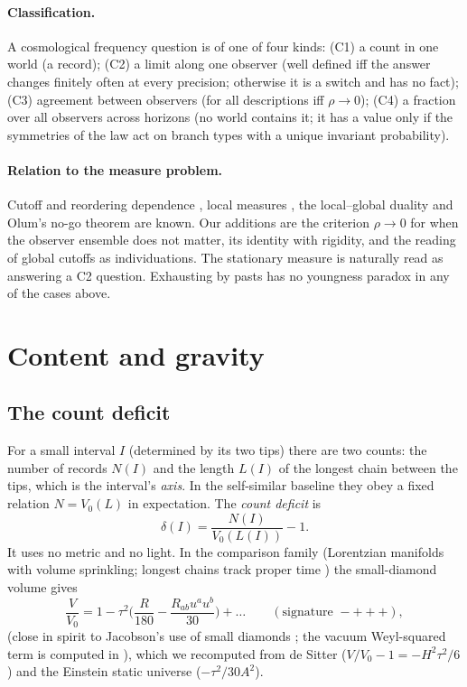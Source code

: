 \documentclass[11pt]{article}
\theoremstyle{definition}
\theoremstyle{remark}
\begin{document}
\paragraph{Classification.} A cosmological frequency question is of one of four kinds: (C1) a count in one world (a record); (C2) a limit along one observer (well defined iff the answer changes finitely often at every precision; otherwise it is a switch and has no fact); (C3) agreement between observers (for all descriptions iff $\rho\to0$); (C4) a fraction over all observers across horizons (no world contains it; it has a value only if the symmetries of the law act on branch types with a unique invariant probability).

\paragraph{Relation to the measure problem.} Cutoff and reordering dependence \cite{winitzki,guthvanchurin,lindenoorbala}, local measures \cite{bousso}, the local--global duality and Olum's no-go theorem \cite{olum} are known. Our additions are the criterion $\rho\to0$ for when the observer ensemble does not matter, its identity with rigidity, and the reading of global cutoffs as individuations. The stationary measure \cite{lvw} is naturally read as answering a C2 question. Exhausting by pasts has no youngness paradox in any of the cases above.

\section{Content and gravity}\label{sec:gravity}

\subsection{The count deficit}

For a small interval $I$ (determined by its two tips) there are two counts: the number of records $N(I)$ and the length $L(I)$ of the longest chain between the tips, which is the interval's \emph{axis}. In the self-similar baseline they obey a fixed relation $N=V_0(L)$ in expectation. The \emph{count deficit} is
\[
\delta(I)=\frac{N(I)}{V_0(L(I))}-1 .
\]
It uses no metric and no light. In the comparison family (Lorentzian manifolds with volume sprinkling; longest chains track proper time \cite{brightwellgregory}) the small-diamond volume gives \cite{gibbonssolodukhin}
\[
\frac{V}{V_0}=1-\tau^2\Big(\frac{R}{180}-\frac{R_{ab}u^au^b}{30}\Big)+\dots\qquad(\text{signature } -+++),
\]
(close in spirit to Jacobson's use of small diamonds \cite{jacobson}; the vacuum Weyl-squared term is computed in \cite{wang}), which we recomputed from de Sitter ($V/V_0-1=-H^2\tau^2/6$) and the Einstein static universe ($-\tau^2/30A^2$).
\end{document}
